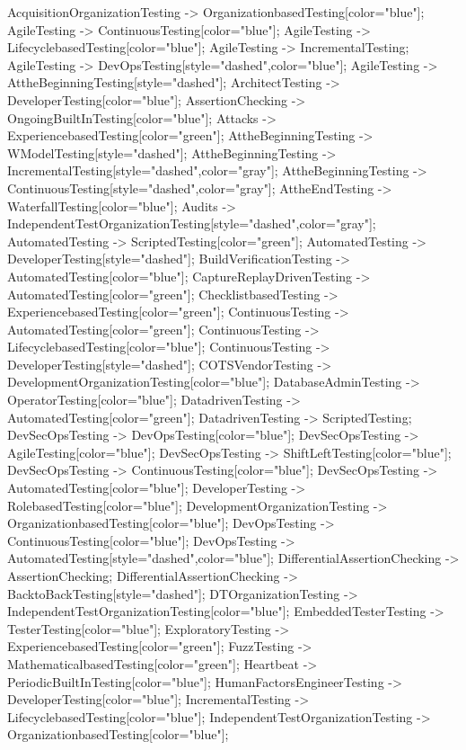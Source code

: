 \documentclass{article}
\begin{document}
{AcquisitionOrganizationTesting -> OrganizationbasedTesting[color="blue"];
AgileTesting -> ContinuousTesting[color="blue"];
AgileTesting -> LifecyclebasedTesting[color="blue"];
AgileTesting -> IncrementalTesting;
AgileTesting -> DevOpsTesting[style="dashed",color="blue"];
AgileTesting -> AttheBeginningTesting[style="dashed"];
ArchitectTesting -> DeveloperTesting[color="blue"];
AssertionChecking -> OngoingBuiltInTesting[color="blue"];
Attacks -> ExperiencebasedTesting[color="green"];
AttheBeginningTesting -> WModelTesting[style="dashed"];
AttheBeginningTesting -> IncrementalTesting[style="dashed",color="gray"];
AttheBeginningTesting -> ContinuousTesting[style="dashed",color="gray"];
AttheEndTesting -> WaterfallTesting[color="blue"];
Audits -> IndependentTestOrganizationTesting[style="dashed",color="gray"];
AutomatedTesting -> ScriptedTesting[color="green"];
AutomatedTesting -> DeveloperTesting[style="dashed"];
BuildVerificationTesting -> AutomatedTesting[color="blue"];
CaptureReplayDrivenTesting -> AutomatedTesting[color="green"];
ChecklistbasedTesting -> ExperiencebasedTesting[color="green"];
ContinuousTesting -> AutomatedTesting[color="green"];
ContinuousTesting -> LifecyclebasedTesting[color="blue"];
ContinuousTesting -> DeveloperTesting[style="dashed"];
COTSVendorTesting -> DevelopmentOrganizationTesting[color="blue"];
DatabaseAdminTesting -> OperatorTesting[color="blue"];
DatadrivenTesting -> AutomatedTesting[color="green"];
DatadrivenTesting -> ScriptedTesting;
DevSecOpsTesting -> DevOpsTesting[color="blue"];
DevSecOpsTesting -> AgileTesting[color="blue"];
DevSecOpsTesting -> ShiftLeftTesting[color="blue"];
DevSecOpsTesting -> ContinuousTesting[color="blue"];
DevSecOpsTesting -> AutomatedTesting[color="blue"];
DeveloperTesting -> RolebasedTesting[color="blue"];
DevelopmentOrganizationTesting -> OrganizationbasedTesting[color="blue"];
DevOpsTesting -> ContinuousTesting[color="blue"];
DevOpsTesting -> AutomatedTesting[style="dashed",color="blue"];
DifferentialAssertionChecking -> AssertionChecking;
DifferentialAssertionChecking -> BacktoBackTesting[style="dashed"];
DTOrganizationTesting -> IndependentTestOrganizationTesting[color="blue"];
EmbeddedTesterTesting -> TesterTesting[color="blue"];
ExploratoryTesting -> ExperiencebasedTesting[color="green"];
FuzzTesting -> MathematicalbasedTesting[color="green"];
Heartbeat -> PeriodicBuiltInTesting[color="blue"];
HumanFactorsEngineerTesting -> DeveloperTesting[color="blue"];
IncrementalTesting -> LifecyclebasedTesting[color="blue"];
IndependentTestOrganizationTesting -> OrganizationbasedTesting[color="blue"];
}
\end{document}
